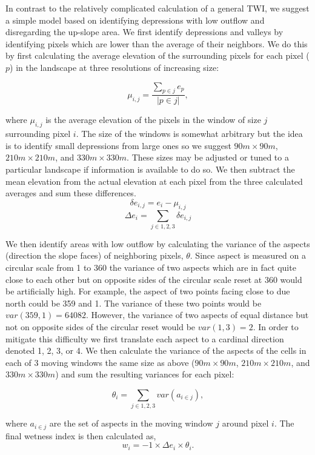 \documentclass{article}\usepackage[]{graphicx}\usepackage[]{color}
\begin{document}
In contrast to the relatively complicated calculation of a general TWI, we suggest a simple model based on identifying depressions with low outflow and disregarding the up-slope area.  We first identify depressions and valleys by identifying pixels which are lower than the average of their neighbors.  We do this by first calculating the average elevation of the surrounding pixels for each pixel ($p$) in the landscape at three resolutions of increasing size:  

$$\mu_{i,j} = \frac{\sum_{p \in j}e_p}{|p \in j|},$$

where $\mu_{i,j}$ is the average elevation of the pixels in the window of size $j$ surrounding pixel $i$.  The size of the windows is somewhat arbitrary but the idea is to identify small depressions from large ones so we suggest $90m \times 90m$, $210m \times 210m$, and $330m \times 330m$.  These sizes may be adjusted or tuned to a particular landscape if information is available to do so.  We then subtract the mean elevation from the actual elevation at each pixel from the three calculated averages and sum these differences.\\

$$\delta e_{i,j} = e_i - \mu_{i,j} $$
$$\Delta e_{i} = \sum_{j \in 1,2,3} \delta e_{i,j}$$

We then identify areas with low outflow by calculating the variance of the aspects (direction the slope faces) of neighboring pixels, $\theta$.  Since aspect is measured on a circular scale from 1 to 360 the variance of two aspects which are in fact quite close to each other but on opposite sides of the circular scale reset at 360 would be artificially high.  For example, the aspect of two points facing close to due north could be 359 and 1.  The variance of these two points would be $var(359,1)= 64082$.  However, the variance of two aspects of equal distance but not on opposite sides of the circular reset would be $var(1,3) = 2$.  In order to mitigate this difficulty we first translate each aspect to a cardinal direction denoted 1, 2, 3, or 4. We then calculate the variance of the aspects of the cells in each of 3 moving windows the same size as above ($90m \times 90m$, $210m \times 210m$, and $330m \times 330m$) and sum the resulting variances for each pixel:

$$\theta_{i} = \sum_{j \in 1,2,3} var(a_{i \in j}),$$

where $a_{i \in j}$ are the set of aspects in the moving window $j$  around pixel $i$.  The final wetness index is then calculated as, 
$$w_i = -1 \times \Delta e_i \times \theta_i.$$
\end{document}
